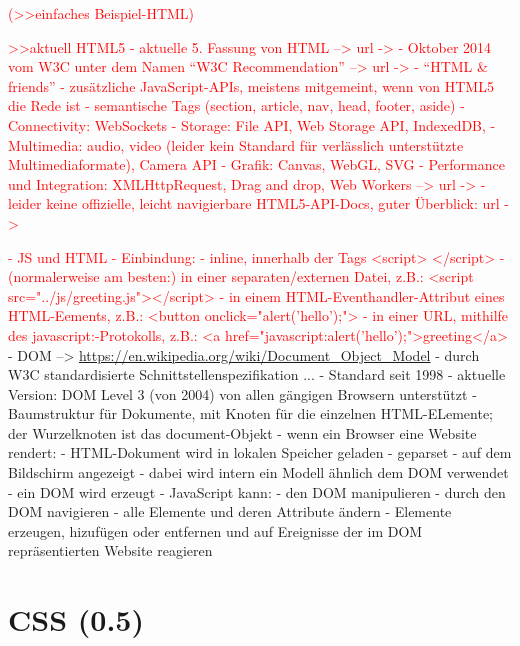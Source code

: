 \documentclass[a4paper, 12pt, hidelinks, listof=totoc, listoftables=totoc, bibliography=totoc]{scrreprt}
\newcommand{\TODO}[1]{\textcolor{red}{#1}\newline}
\begin{document}
\TODO{(>>einfaches Beispiel-HTML)}

\TODO{>>aktuell HTML5}
\TODO{	- aktuelle 5. Fassung von HTML  -->  url -> %
	}
\TODO{	- Oktober 2014 vom W3C unter dem Namen "`W3C Recommendation"'  -->  url -> %
}
\TODO{	- "`HTML \& friends"' - zusätzliche JavaScript-APIs, meistens mitgemeint, wenn von HTML5 die Rede ist
		- semantische Tags (section, article, nav, head, footer, aside)
		- Connectivity: WebSockets
		- Storage: File API, Web Storage API, IndexedDB, 
		- Multimedia: audio, video (leider kein Standard für verlässlich unterstützte Multimediaformate), Camera API
		- Grafik: Canvas, WebGL, SVG
		- Performance und Integration: XMLHttpRequest, Drag and drop, Web Workers}
\TODO{	-->  url -> %
}
\TODO{	- leider keine offizielle, leicht navigierbare HTML5-API-Docs, guter Überblick: url -> %
}

\TODO{- JS und HTML
	- Einbindung:
		- inline, innerhalb der Tags <script> </script>
		- (normalerweise am besten:) in einer separaten/externen Datei, z.B.: <script src="../js/greeting.js"></script>
		- in einem HTML-Eventhandler-Attribut eines HTML-Eements, z.B.: <button onclick="alert('hello');">
		- in einer URL, mithilfe des javascript:-Protokolls, z.B.: <a href="javascript:alert('hello');">greeting</a>
}
- DOM  --> \url{https://en.wikipedia.org/wiki/Document_Object_Model}
	- durch W3C standardisierte Schnittstellenspezifikation ...
	- Standard seit 1998
	- aktuelle Version: DOM Level 3 (von 2004) von allen gängigen Browsern unterstützt
	- Baumstruktur für Dokumente, mit Knoten für die einzelnen HTML-ELemente; der Wurzelknoten ist das document-Objekt
	- wenn ein Browser eine Website rendert:
		- HTML-Dokument wird in lokalen Speicher geladen
		- geparset
		- auf dem Bildschirm angezeigt
		- dabei wird intern ein Modell ähnlich dem DOM verwendet
		- ein DOM wird erzeugt
	- JavaScript kann:
		- den DOM manipulieren
		- durch den DOM navigieren
		- alle Elemente und deren Attribute ändern
		- Elemente erzeugen, hizufügen oder entfernen und auf Ereignisse der im DOM repräsentierten Website reagieren



\section{CSS (0.5)}
\end{document}
